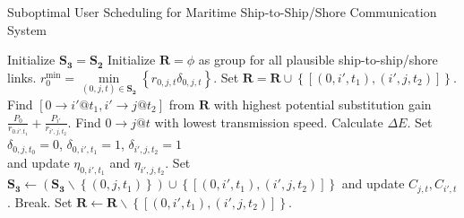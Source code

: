 \documentclass[conference]{IEEEtran}
\begin{document}
\begin{algorithm}[h]
\caption{Suboptimal User Scheduling for Maritime Ship-to-Ship/Shore Communication System}
\label{alg:1}
\begin{algorithmic}[1]
\STATE Initialize ${{\mathbf{S}}_{\mathbf{3}}}={{\mathbf{S}}_{\mathbf{2}}}$
  \STATE Initialize ${\mathbf{R}} = \phi $ as group for all plausible ship-to-ship/shore links.
  \STATE $r_0^{\min } = \mathop {\min }\limits_{\left( {0,j,t} \right) \in {{\mathbf{S}}_{\mathbf{2}}}} \left\{ {r_{0,j,t}{\delta _{0,j,t}}} \right\}$.
            \STATE Set ${\mathbf{R = R}} \cup \left\{ {\left[ {\left( {0,i',{t_1}} \right),\left( {i',j,{t_2}} \right)} \right]} \right\}$.
          \ENDIF
        \ENDFOR
      \ENDIF
    \ENDFOR
  \ENDFOR
    \STATE Find $\left[ {0 \to i'@{t_1},i' \to j@{t_2}} \right]$ from ${\mathbf{R}}$ with highest potential substitution gain $ {\frac{{{P_0}}}{{{r_{0.i'.{t_1}}}}} + \frac{{{P_{i'}}}}{{{r_{i',j,{t_2}}}}}} $. 
      \STATE Find $0 \to j @ t$ with lowest transmission speed. \STATE Calculate ${\Delta E}$.
        \STATE Set ${\delta _{0,j,{t_0}} = 0}$, ${\delta _{0,i',{t_1}} = 1}$, ${\delta _{i',j,{t_2}} = 1}$\\ and update ${\eta _{0,i',{t_1}}}$ and ${\eta _{i',j,{t_2}}}$. 
        \STATE Set ${{\mathbf{S}}_{\mathbf{3}}} \leftarrow \left( {{{\mathbf{S}}_{\mathbf{3}}}\backslash \left\{ {\left( {0,j,{t_1}} \right)} \right\}} \right) \cup \left\{ {\left[ {\left( {0,i',{t_1}} \right),\left( {i',j,{t_2}} \right)} \right]} \right\}$ and update ${C_{j,t}},{C_{i',t}}$.
      \ELSE
        \STATE Break.
      \ENDIF
    \ENDWHILE 
    \STATE Set $\mathbf{R} \leftarrow \mathbf{R}\backslash \left\{ {\left[ {\left( {0,i',{t_1}} \right),\left( {i',j,{t_2}} \right)} \right]} \right\}$.
    
  \ENDWHILE
\ENDFOR
\end{algorithmic}
\end{algorithm}
\end{document}
